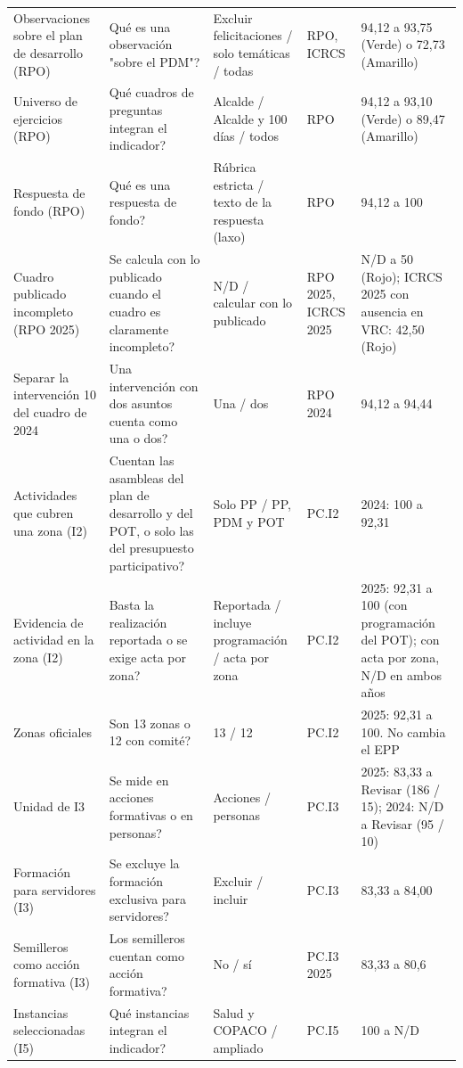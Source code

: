\documentclass[11pt,letterpaper]{article}
\begin{document}
{\begin{xltabular}{\linewidth}{L{2.6cm}L{3.1cm}L{2.5cm}L{2.4cm}Y}
Observaciones sobre el plan de desarrollo (RPO) & \textquestiondown{}Qué es una observación "sobre el PDM"? & Excluir felicitaciones / solo temáticas / todas & RPO, ICRCS & 94,12 a 93,75 (Verde) o 72,73 (Amarillo) \\
Universo de ejercicios (RPO) & \textquestiondown{}Qué cuadros de preguntas integran el indicador? & Alcalde / Alcalde y 100 días / todos & RPO & 94,12 a 93,10 (Verde) o 89,47 (Amarillo) \\
Respuesta de fondo (RPO) & \textquestiondown{}Qué es una respuesta de fondo? & Rúbrica estricta / texto de la respuesta (laxo) & RPO & 94,12 a 100 \\
Cuadro publicado incompleto (RPO 2025) & \textquestiondown{}Se calcula con lo publicado cuando el cuadro es claramente incompleto? & N/D / calcular con lo publicado & RPO 2025, ICRCS 2025 & N/D a 50 (Rojo); ICRCS 2025 con ausencia en VRC: 42,50 (Rojo) \\
Separar la intervención 10 del cuadro de 2024 & \textquestiondown{}Una intervención con dos asuntos cuenta como una o dos? & Una / dos & RPO 2024 & 94,12 a 94,44 \\
Actividades que cubren una zona (I2) & \textquestiondown{}Cuentan las asambleas del plan de desarrollo y del POT, o solo las del presupuesto participativo? & Solo PP / PP, PDM y POT & PC.I2 & 2024: 100 a 92,31 \\
Evidencia de actividad en la zona (I2) & \textquestiondown{}Basta la realización reportada o se exige acta por zona? & Reportada / incluye programación / acta por zona & PC.I2 & 2025: 92,31 a 100 (con programación del POT); con acta por zona, N/D en ambos años \\
Zonas oficiales & \textquestiondown{}Son 13 zonas o 12 con comité? & 13 / 12 & PC.I2 & 2025: 92,31 a 100. No cambia el EPP \\
Unidad de I3 & \textquestiondown{}Se mide en acciones formativas o en personas? & Acciones / personas & PC.I3 & 2025: 83,33 a Revisar (186 / 15); 2024: N/D a Revisar (95 / 10) \\
Formación para servidores (I3) & \textquestiondown{}Se excluye la formación exclusiva para servidores? & Excluir / incluir & PC.I3 & 83,33 a 84,00 \\
Semilleros como acción formativa (I3) & \textquestiondown{}Los semilleros cuentan como acción formativa? & No / sí & PC.I3 2025 & 83,33 a 80,6 \\
Instancias seleccionadas (I5) & \textquestiondown{}Qué instancias integran el indicador? & Salud y COPACO / ampliado & PC.I5 & 100 a N/D \\

\end{xltabular}}
\end{document}
